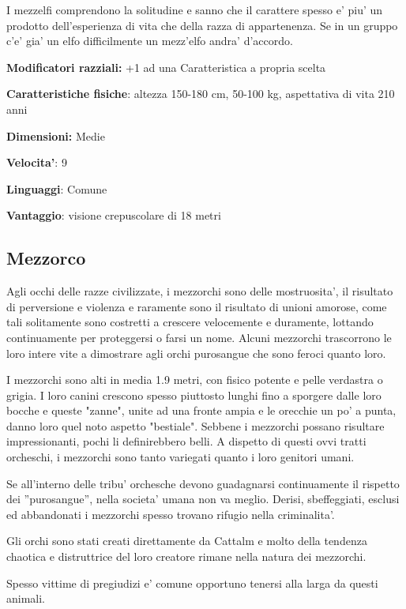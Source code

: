 \documentclass[a4paper,11pt,twoside,openany]{book}
\begin{document}
I mezzelfi comprendono la solitudine e sanno che il carattere spesso e' piu' un prodotto dell'esperienza di vita che della razza di appartenenza. Se in un gruppo c'e' gia' un elfo difficilmente un mezz'elfo andra' d'accordo.

\textbf{Modificatori razziali:} +1 ad una Caratteristica a propria
scelta

\textbf{Caratteristiche fisiche}: altezza 150-180 cm, 50-100 kg, aspettativa
di vita 210 anni

\textbf{Dimensioni:} Medie

\textbf{Velocita'}: 9

\textbf{Linguaggi}: Comune

\textbf{Vantaggio}: visione crepuscolare di 18 metri


\subsection{Mezzorco}

\label{mezzorco}

Agli occhi delle razze civilizzate, i mezzorchi sono delle mostruosita', il risultato di perversione e violenza e raramente sono il risultato di unioni amorose, come tali solitamente sono costretti a crescere velocemente e duramente, lottando continuamente per proteggersi o farsi un nome. Alcuni mezzorchi trascorrono le loro intere vite a dimostrare agli orchi purosangue che sono feroci quanto loro.

I mezzorchi sono alti in media 1.9 metri, con fisico potente e pelle verdastra o grigia. I loro canini crescono spesso piuttosto lunghi fino a sporgere dalle loro bocche e queste "zanne", unite ad una fronte ampia e le orecchie un po' a punta, danno loro quel noto aspetto "bestiale". Sebbene i mezzorchi possano risultare impressionanti, pochi li definirebbero belli. A dispetto di questi ovvi tratti orcheschi, i mezzorchi sono tanto variegati quanto i loro genitori umani.

Se all'interno delle tribu' orchesche devono guadagnarsi continuamente il rispetto dei ''purosangue'', nella societa' umana non va meglio. Derisi, sbeffeggiati, esclusi ed abbandonati i mezzorchi spesso trovano rifugio nella criminalita'.

Gli orchi sono stati creati direttamente da Cattalm e molto della tendenza chaotica e distruttrice del loro creatore rimane nella natura dei mezzorchi.

Spesso vittime di pregiudizi e' comune opportuno tenersi alla larga da questi animali.
\end{document}
